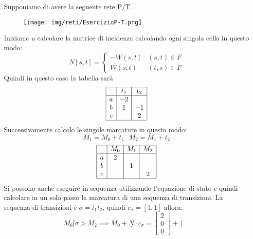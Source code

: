 \begin{esempio}
    Supponiamo di avere la seguente rete P/T.
    \begin{figure}
        \centering
        \texttt{[image: img/reti/EsercizioP-T.png]}
    \end{figure}
    Iniziamo a calcolare la matrice di incidenza calcolando ogni singola cella 
    in questo modo:
    $$N[s,t]= \begin{cases}
        - W(s,t)& (s,t)\in F\\
        W(s,t)& (t,s)\in F
    \end{cases}$$
    Quindi in questo caso la tabella sarà
    \begin{equation}
        \begin{array}{|c|c|c|}
            \hline
              &t_1&t_2\\
            \hline
            a & -2 & \\
            b & 1 & -1\\
            c &   & 2\\
            \hline
        \end{array}
    \end{equation}
    Successivamente calcolo le singole marcature in questo modo:
    $$M_1 = M_0 + t_1 \ \ \ M_2 = M_1 + t_2 $$
    \begin{equation}
        \begin{array}{|c|c|c|c|}
            \hline
              &M_0&M_1&M_2\\
            \hline
            a & 2 &  &\\
            b &  & 1 &\\
            c &   &  & 2\\
            \hline
        \end{array}
    \end{equation}
    Si possono anche eseguire in sequenza utilizzando l'equazione di stato e quindi
    calcolare in un solo passo la marcatura di una sequenza di transizioni. La 
    sequenza di transizioni è $\sigma = t_1t_2$, quindi $c_\sigma = \left[1,1\right]$
    allora:
    \begin{equation}
        M_0[\sigma>M_2 \implies \underline{M_0}+\underline{N}\cdot \underline{c_\sigma}
        = \left[\begin{array} {c}
            2\\ 0 \\ 0
        \end{array}\right] + \left[\begin{array} {cc}

\end{array}
\end{equation}
\end{esempio}
